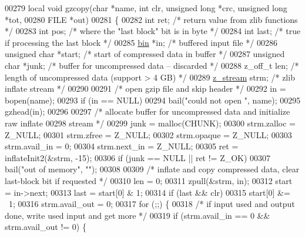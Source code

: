 \begin{DoxyCode}
{00279 local \textcolor{keywordtype}{void} gzcopy(\textcolor{keywordtype}{char} *name, \textcolor{keywordtype}{int} clr, \textcolor{keywordtype}{unsigned} \textcolor{keywordtype}{long} *crc, \textcolor{keywordtype}{unsigned} \textcolor{keywordtype}{long} *tot,
00280                   FILE *out)
00281 \{
00282     \textcolor{keywordtype}{int} ret;                \textcolor{comment}{/* return value from zlib functions */}
00283     \textcolor{keywordtype}{int} pos;                \textcolor{comment}{/* where the "last block" bit is in byte */}
00284     \textcolor{keywordtype}{int} last;               \textcolor{comment}{/* true if processing the last block */}
00285     \hyperlink{structbin}{bin} *in;                \textcolor{comment}{/* buffered input file */}
00286     \textcolor{keywordtype}{unsigned} \textcolor{keywordtype}{char} *start;   \textcolor{comment}{/* start of compressed data in buffer */}
00287     \textcolor{keywordtype}{unsigned} \textcolor{keywordtype}{char} *junk;    \textcolor{comment}{/* buffer for uncompressed data -- discarded */}
00288     z\_off\_t len;            \textcolor{comment}{/* length of uncompressed data (support > 4 GB) */}
00289     \hyperlink{structz__stream__s}{z\_stream} strm;          \textcolor{comment}{/* zlib inflate stream */}
00290 
00291     \textcolor{comment}{/* open gzip file and skip header */}
00292     in = bopen(name);
00293     \textcolor{keywordflow}{if} (in == NULL)
00294         bail(\textcolor{stringliteral}{"could not open "}, name);
00295     gzhead(in);
00296 
00297     \textcolor{comment}{/* allocate buffer for uncompressed data and initialize raw inflate}
00298 \textcolor{comment}{       stream */}
00299     junk = malloc(CHUNK);
00300     strm.zalloc = Z\_NULL;
00301     strm.zfree = Z\_NULL;
00302     strm.opaque = Z\_NULL;
00303     strm.avail\_in = 0;
00304     strm.next\_in = Z\_NULL;
00305     ret = inflateInit2(&strm, -15);
00306     \textcolor{keywordflow}{if} (junk == NULL || ret != Z\_OK)
00307         bail(\textcolor{stringliteral}{"out of memory"}, \textcolor{stringliteral}{""});
00308 
00309     \textcolor{comment}{/* inflate and copy compressed data, clear last-block bit if requested */}
00310     len = 0;
00311     zpull(&strm, in);
00312     start = in->next;
00313     last = start[0] & 1;
00314     \textcolor{keywordflow}{if} (last && clr)
00315         start[0] &= ~1;
00316     strm.avail\_out = 0;
00317     \textcolor{keywordflow}{for} (;;) \{
00318         \textcolor{comment}{/* if input used and output done, write used input and get more */}
00319         \textcolor{keywordflow}{if} (strm.avail\_in == 0 && strm.avail\_out != 0) \{
}
\end{DoxyCode}
